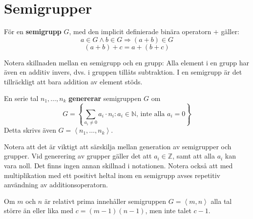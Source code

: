 \section{Semigrupper}

\begin{Definition}
För en \textbf{semigrupp} $G$, med den implicit definierade binära operatorn $+$ gäller:
\[a \in G \wedge b \in G \Longrightarrow (a + b) \in G\]
\[(a+b)+c = a+(b+c)\]
\end{Definition}

Notera skillnaden mellan en semigrupp och en grupp: Alla element i en grupp har även en additiv invers, dvs. i gruppen tillåts subtraktion. I en semigrupp är det tillräckligt att bara addition av element stöds.

\begin{Definition}
En serie tal $n_1, \ldots, n_k$ \textbf{genererar} semigruppen $G$ om
\[G = \left\{\sum_{a_i\neq 0} a_i \cdot n_i : a_i \in \mathbb{N}\text{, inte alla $a_i=0$}\right\}\] 
Detta skrivs även $G = \left<n_1, \ldots, n_k \right>$.
\end{Definition}

Notera att det är viktigt att särskilja mellan generation av semigrupper och grupper. Vid generering av grupper gäller det att $a_i \in \mathbb{Z}$, samt att alla $a_i$ kan vara noll. Det finns ingen annan skillnad i notationen. Notera också att med multiplikation med ett positivt heltal inom en semigrupp avses repetitiv användning av additionsoperatorn.

\begin{Theorem}
\label{S1}
Om $m$ och $n$ är relativt prima innehåller semigruppen $G = \left<m, n\right>$ alla tal större än eller lika med $c = (m - 1)(n - 1)$, men inte talet $c - 1$.
\end{Theorem}

